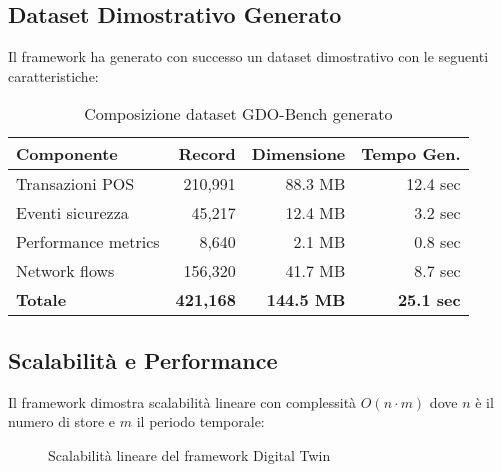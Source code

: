 \subsection{\texorpdfstring{Dataset Dimostrativo Generato}{B.1.5 - Dataset Dimostrativo Generato}}

Il framework ha generato con successo un dataset dimostrativo con le seguenti caratteristiche:

\begin{table}[h]
\centering
\caption{Composizione dataset GDO-Bench generato}
\label{tab:dataset-composition}
\begin{tabular}{@{}lrrr@{}}
\toprule
\textbf{Componente} & \textbf{Record} & \textbf{Dimensione} & \textbf{Tempo Gen.} \\
\midrule
Transazioni POS & 210,991 & 88.3 MB & 12.4 sec \\
Eventi sicurezza & 45,217 & 12.4 MB & 3.2 sec \\
Performance metrics & 8,640 & 2.1 MB & 0.8 sec \\
Network flows & 156,320 & 41.7 MB & 8.7 sec \\
\midrule
\textbf{Totale} & \textbf{421,168} & \textbf{144.5 MB} & \textbf{25.1 sec} \\
\bottomrule
\end{tabular}
\end{table}

\subsection{\texorpdfstring{Scalabilità e Performance}{B.1.6 - Scalabilità e Performance}}

Il framework dimostra scalabilità lineare con complessità $O(n \cdot m)$ dove $n$ è il numero di store e $m$ il periodo temporale:

\begin{figure}[h]
\centering
{}
\caption{Scalabilità lineare del framework Digital Twin}
\label{fig:scalability}
\end{figure}

